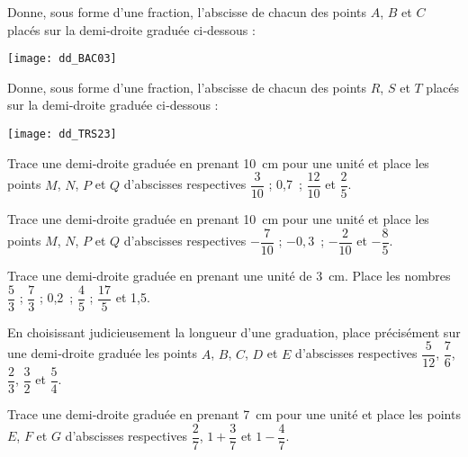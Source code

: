 

\begin{exercice}
Donne, sous forme d'une fraction, l'abscisse de chacun des points $A$, $B$ et $C$ placés sur la demi‑droite graduée ci‑dessous :
\begin{center} \texttt{[image: dd\_BAC03]} \end{center}
Donne, sous forme d'une fraction, l'abscisse de chacun des points $R$, $S$ et $T$ placés sur la demi‑droite graduée ci‑dessous :
\begin{center} \texttt{[image: dd\_TRS23]} \end{center}
\end{exercice}


\begin{exercice}
Trace une demi‑droite graduée en prenant 10 cm pour une unité et place les points $M$, $N$, $P$ et $Q$ d'abscisses respectives $\dfrac{3}{10}$ ; 0,7 ; $\dfrac{12}{10}$ et $\dfrac{2}{5}$.
\end{exercice}


\begin{exercice}
Trace une demi‑droite graduée en prenant 10 cm pour une unité et place les points $M$, $N$, $P$ et $Q$ d'abscisses respectives $- \dfrac{7}{10}$ ; $- 0,3$ ; $- \dfrac{2}{10}$ et $- \dfrac{8}{5}$.
\end{exercice}


\begin{exercice}
Trace une demi‑droite graduée en prenant une unité de 3 cm. Place les nombres $\dfrac{5}{3}$ ; $\dfrac{7}{3}$ ; 0,2 ; $\dfrac{4}{5}$ ; $\dfrac{17}{5}$ et 1,5.
\end{exercice}


\begin{exercice}
En choisissant judicieusement la longueur d'une graduation, place précisément sur une demi‑droite graduée les points $A$, $B$, $C$, $D$ et $E$ d'abscisses respectives $\dfrac{5}{12}$, $\dfrac{7}{6}$, $\dfrac{2}{3}$, $\dfrac{3}{2}$ et $\dfrac{5}{4}$.
\end{exercice}


\begin{exercice}
Trace une demi‑droite graduée en prenant 7 cm pour une unité et place les points $E$, $F$ et $G$ d'abscisses respectives $\dfrac{2}{7}$, $1 + \dfrac{3}{7}$ et $1 - \dfrac{4}{7}$.
\end{exercice}


